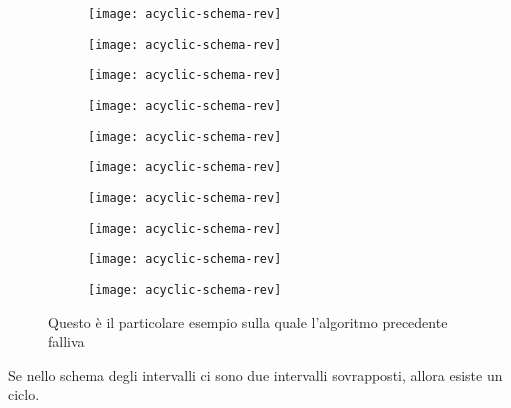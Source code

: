 \begin{figure}[H]

	\begin{subfigure}{.20\textwidth}
		\texttt{[image: acyclic-schema-rev]}
	\end{subfigure}\hfill
	\begin{subfigure}{.20\textwidth}
		\texttt{[image: acyclic-schema-rev]}
	\end{subfigure}\hfill
	\begin{subfigure}{.20\textwidth}
		\texttt{[image: acyclic-schema-rev]}
	\end{subfigure}\hfill
	\begin{subfigure}{.20\textwidth}
		\texttt{[image: acyclic-schema-rev]}
	\end{subfigure}\hfill
	\begin{subfigure}{.20\textwidth}
		\texttt{[image: acyclic-schema-rev]}
	\end{subfigure}

	\begin{subfigure}{.20\textwidth}
		\texttt{[image: acyclic-schema-rev]}
	\end{subfigure}\hfill
	\begin{subfigure}{.20\textwidth}
		\texttt{[image: acyclic-schema-rev]}
	\end{subfigure}\hfill
	\begin{subfigure}{.20\textwidth}
		\texttt{[image: acyclic-schema-rev]}
	\end{subfigure}\hfill
	\begin{subfigure}{.20\textwidth}
		\texttt{[image: acyclic-schema-rev]}
	\end{subfigure}\hfill
	\begin{subfigure}{.20\textwidth}
		\texttt{[image: acyclic-schema-rev]}
	\end{subfigure}

	\caption[]{Questo è il particolare esempio sulla quale l'algoritmo precedente falliva}
\end{figure}


\begin{note}
Se nello schema degli intervalli ci sono due intervalli sovrapposti, allora esiste un ciclo.
\end{note}

